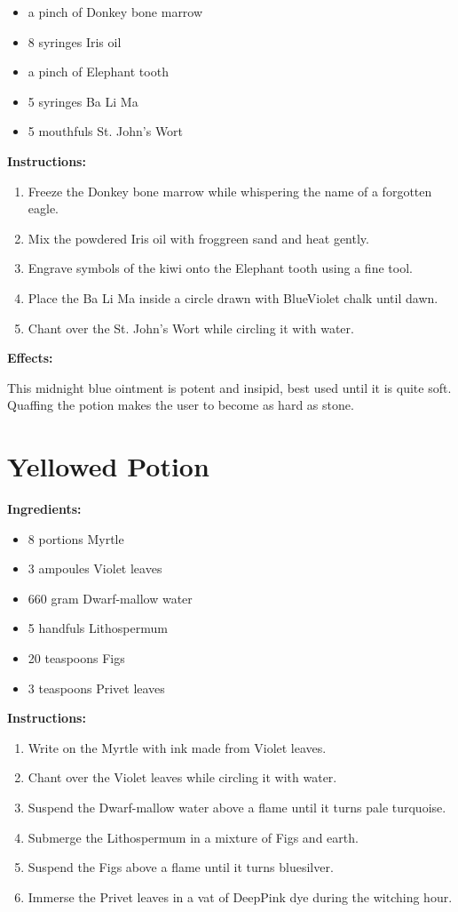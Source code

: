 \documentclass{article}
\begin{document}
\begin{itemize}
  \item a pinch of Donkey bone marrow
  \item 8 syringes Iris oil
  \item a pinch of Elephant tooth
  \item 5 syringes Ba Li Ma
  \item 5 mouthfuls St. John's Wort
\end{itemize}

\textbf{Instructions:}

\begin{enumerate}
  \item Freeze the Donkey bone marrow while whispering the name of a forgotten eagle.
  \item Mix the powdered Iris oil with froggreen sand and heat gently.
  \item Engrave symbols of the kiwi onto the Elephant tooth using a fine tool.
  \item Place the Ba Li Ma inside a circle drawn with BlueViolet chalk until dawn.
  \item Chant over the St. John's Wort while circling it with water.
\end{enumerate}

\textbf{Effects:}

This midnight blue ointment is potent and insipid, best used until it is quite soft. Quaffing the potion makes the user to become as hard as stone.

\newpage
\section*{Yellowed Potion}

\textbf{Ingredients:}

\begin{itemize}
  \item 8 portions Myrtle
  \item 3 ampoules Violet leaves
  \item 660 gram Dwarf-mallow water
  \item 5 handfuls Lithospermum
  \item 20 teaspoons Figs
  \item 3 teaspoons Privet leaves
\end{itemize}

\textbf{Instructions:}

\begin{enumerate}
  \item Write on the Myrtle with ink made from Violet leaves.
  \item Chant over the Violet leaves while circling it with water.
  \item Suspend the Dwarf-mallow water above a flame until it turns pale turquoise.
  \item Submerge the Lithospermum in a mixture of Figs and earth.
  \item Suspend the Figs above a flame until it turns bluesilver.
  \item Immerse the Privet leaves in a vat of DeepPink dye during the witching hour.
\end{enumerate}
\end{document}

